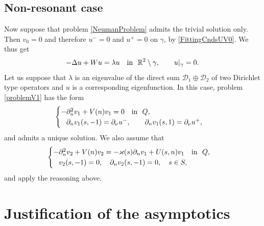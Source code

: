 \documentclass[reqno]{amsart}
\theoremstyle{plain}
\numberwithin{equation}{section}
\renewcommand{\kappa}{\varkappa}
\newcommand{\Real}{\mathbb R}
\newcommand{\pte}{\partial_n}
\begin{document}
\subsection{Non-resonant case}
Now suppose that problem \eqref{NeumanProblem} admits the trivial solution only.  Then $v_0=0$ and therefore $u^-=0$ and $u^+=0$ on $\gamma$, by \eqref{FittingCndsUV0}. We thus get
\begin{equation*}
-\Delta u+Wu=\lambda u\quad \hbox{in \ } \Real^2\setminus \gamma,\qquad
 u|_{\gamma}=0.
\end{equation*}
Let us suppose that $\lambda$ is an eigenvalue of the direct sum
$\mathcal{D}_1\oplus\mathcal{D}_2$ of two Dirichlet type operators and $u$ is a corresponding eigenfunction.
In this case, problem \eqref{problemV1} has the form
\begin{equation}\label{problemV1Non}
\begin{cases}
    -\pte^2 v_1+V(n)v_1=0\quad \hbox{in \ } Q, \\
    \phantom{-}\partial_n v_1(s, -1)=\partial_\nu u^-, \qquad
\partial_n v_1(s, 1)=\partial_\nu u^+,
\end{cases}
\end{equation}
and admits a unique solution. We also assume that
\begin{equation*}
\begin{cases}
-\pte^2 v_2+V(n)v_2=-\kappa(s)\pte v_1 +U(s,n) v_1
  \quad \hbox{in \ } Q,
\\
   \phantom{-} v_2(s, -1)=0,
 \quad
 \partial_n v_2(s, -1)=0, \quad s\in S,
\end{cases}
\end{equation*}
and apply the reasoning above.




\section{Justification of the asymptotics}
\end{document}

